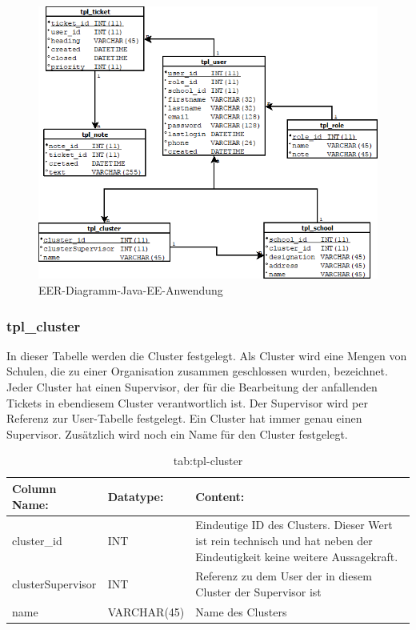 \begin{figure}[h]
	\centering
	\includegraphics[scale=.7]{figures/JAVAeeDatabaseDiagramm.PNG}
	\caption{EER-Diagramm-Java-EE-Anwendung}
	\label{EER-Diagramm-Java-EE-Anwendung}
\end{figure}

\newpage

\subsubsection{tpl\_cluster}

In dieser Tabelle werden die Cluster festgelegt. Als Cluster wird eine Mengen von Schulen, die zu einer Organisation zusammen geschlossen wurden, bezeichnet. Jeder Cluster hat einen Supervisor, der für die Bearbeitung der anfallenden Tickets in ebendiesem Cluster verantwortlich ist.
Der Supervisor wird per Referenz zur User-Tabelle festgelegt. Ein Cluster hat immer genau einen Supervisor. Zusätzlich wird noch ein Name für den Cluster festgelegt.

\begin{table}[h]
	\begin{tabular}{|p{3.5cm}|p{4cm}|p{6.2cm}|}
		\hline
		\textbf{Column Name:} & \textbf{Datatype:} & \textbf{Content:}\\
		\hline
		cluster\_id & INT & Eindeutige ID des Clusters. Dieser Wert ist rein technisch und hat neben der Eindeutigkeit keine weitere Aussagekraft.\\
		\hline
		clusterSupervisor & INT & Referenz zu dem User der in diesem Cluster der Supervisor ist\\
		\hline
		name & VARCHAR(45) & Name des Clusters\\
		\hline
	\end{tabular}
	\caption{tab:tpl-cluster}
\end{table}
\label{tab:tpl_cluster}

